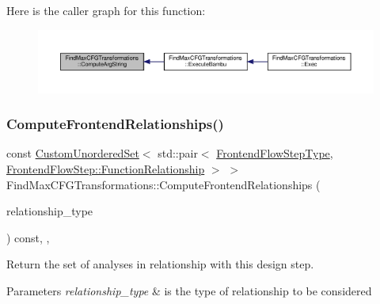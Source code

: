 Here is the caller graph for this function\+:
\nopagebreak
\begin{figure}[H]
\begin{center}
\leavevmode
\includegraphics[width=350pt]{d7/d5e/classFindMaxCFGTransformations_a926abf2592f4fc8ca8b030476b0cdbae_icgraph}
\end{center}
\end{figure}
\mbox{\label{classFindMaxCFGTransformations_a3a6feda897d0aa27128f9ae8b884cea1}} 
\subsubsection{\texorpdfstring{Compute\+Frontend\+Relationships()}{ComputeFrontendRelationships()}}
{\footnotesize\ttfamily const \hyperlink{classCustomUnorderedSet}{Custom\+Unordered\+Set}$<$ std\+::pair$<$ \hyperlink{frontend__flow__step_8hpp_afeb3716c693d2b2e4ed3e6d04c3b63bb}{Frontend\+Flow\+Step\+Type}, \hyperlink{classFrontendFlowStep_af7cf30f2023e5b99e637dc2058289ab0}{Frontend\+Flow\+Step\+::\+Function\+Relationship} $>$ $>$ Find\+Max\+C\+F\+G\+Transformations\+::\+Compute\+Frontend\+Relationships (\begin{DoxyParamCaption}\item[{const \hyperlink{classDesignFlowStep_a723a3baf19ff2ceb77bc13e099d0b1b7}{Design\+Flow\+Step\+::\+Relationship\+Type}}]{relationship\+\_\+type }\end{DoxyParamCaption}) const\hspace{0.3cm}{\ttfamily [override]}, {\ttfamily [private]}, {\ttfamily [virtual]}}



Return the set of analyses in relationship with this design step. 


\begin{DoxyParams}{Parameters}
{\em relationship\+\_\+type} & is the type of relationship to be considered \\
\hline
\end{DoxyParams}


